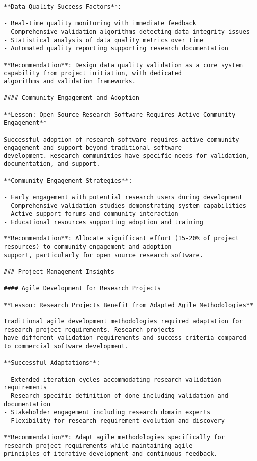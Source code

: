 \documentclass[12pt,a4paper]{report}
\begin{document}
\begin{verbatim}
**Data Quality Success Factors**:

- Real-time quality monitoring with immediate feedback
- Comprehensive validation algorithms detecting data integrity issues
- Statistical analysis of data quality metrics over time
- Automated quality reporting supporting research documentation

**Recommendation**: Design data quality validation as a core system capability from project initiation, with dedicated
algorithms and validation frameworks.

#### Community Engagement and Adoption

**Lesson: Open Source Research Software Requires Active Community Engagement**

Successful adoption of research software requires active community engagement and support beyond traditional software
development. Research communities have specific needs for validation, documentation, and support.

**Community Engagement Strategies**:

- Early engagement with potential research users during development
- Comprehensive validation studies demonstrating system capabilities
- Active support forums and community interaction
- Educational resources supporting adoption and training

**Recommendation**: Allocate significant effort (15-20% of project resources) to community engagement and adoption
support, particularly for open source research software.

### Project Management Insights

#### Agile Development for Research Projects

**Lesson: Research Projects Benefit from Adapted Agile Methodologies**

Traditional agile development methodologies required adaptation for research project requirements. Research projects
have different validation requirements and success criteria compared to commercial software development.

**Successful Adaptations**:

- Extended iteration cycles accommodating research validation requirements
- Research-specific definition of done including validation and documentation
- Stakeholder engagement including research domain experts
- Flexibility for research requirement evolution and discovery

**Recommendation**: Adapt agile methodologies specifically for research project requirements while maintaining agile
principles of iterative development and continuous feedback.


\end{verbatim}
\end{document}
